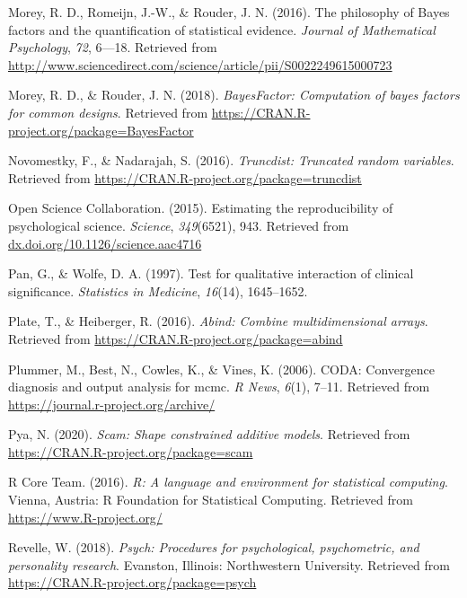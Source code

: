 \documentclass[english,,man]{apa6}
\begin{document}
\leavevmode\hypertarget{ref-Morey:etal:2016}{}%
Morey, R. D., Romeijn, J.-W., \& Rouder, J. N. (2016). The philosophy of Bayes factors and the quantification of statistical evidence. \emph{Journal of Mathematical Psychology}, \emph{72}, 6---18. Retrieved from \url{http://www.sciencedirect.com/science/article/pii/S0022249615000723}

\leavevmode\hypertarget{ref-R-BayesFactor}{}%
Morey, R. D., \& Rouder, J. N. (2018). \emph{BayesFactor: Computation of bayes factors for common designs}. Retrieved from \url{https://CRAN.R-project.org/package=BayesFactor}

\leavevmode\hypertarget{ref-R-truncdist}{}%
Novomestky, F., \& Nadarajah, S. (2016). \emph{Truncdist: Truncated random variables}. Retrieved from \url{https://CRAN.R-project.org/package=truncdist}

\leavevmode\hypertarget{ref-OpenScienceCollaboration:2015}{}%
Open Science Collaboration. (2015). Estimating the reproducibility of psychological science. \emph{Science}, \emph{349}(6521), 943. Retrieved from \href{dx.doi.org/10.1126/science.aac4716\%20}{dx.doi.org/10.1126/science.aac4716 }

\leavevmode\hypertarget{ref-Pan:Wolfe:1997}{}%
Pan, G., \& Wolfe, D. A. (1997). Test for qualitative interaction of clinical significance. \emph{Statistics in Medicine}, \emph{16}(14), 1645--1652.

\leavevmode\hypertarget{ref-R-abind}{}%
Plate, T., \& Heiberger, R. (2016). \emph{Abind: Combine multidimensional arrays}. Retrieved from \url{https://CRAN.R-project.org/package=abind}

\leavevmode\hypertarget{ref-R-coda}{}%
Plummer, M., Best, N., Cowles, K., \& Vines, K. (2006). CODA: Convergence diagnosis and output analysis for mcmc. \emph{R News}, \emph{6}(1), 7--11. Retrieved from \url{https://journal.r-project.org/archive/}

\leavevmode\hypertarget{ref-R-scam}{}%
Pya, N. (2020). \emph{Scam: Shape constrained additive models}. Retrieved from \url{https://CRAN.R-project.org/package=scam}

\leavevmode\hypertarget{ref-R-base}{}%
R Core Team. (2016). \emph{R: A language and environment for statistical computing}. Vienna, Austria: R Foundation for Statistical Computing. Retrieved from \url{https://www.R-project.org/}

\leavevmode\hypertarget{ref-R-psych}{}%
Revelle, W. (2018). \emph{Psych: Procedures for psychological, psychometric, and personality research}. Evanston, Illinois: Northwestern University. Retrieved from \url{https://CRAN.R-project.org/package=psych}
\end{document}
